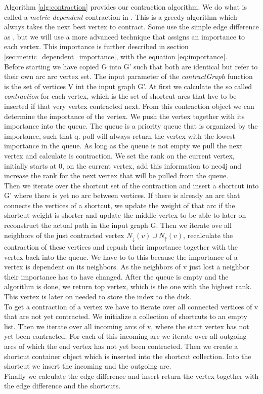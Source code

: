Algorithm \ref{alg:contraction} provides our contraction algorithm. We do what is called a \textit{metric dependent} contraction in \cite[Customization Contraction Hierarchies]{CCH}. 
This is a greedy algorithm which always takes the next best vertex to contract. Some use the simple edge difference as \cite[Contraction Hierarchies]{Geisberger_2012}, but we will use
a more advanced technique that assigns an importance to each vertex. This importance is further described in section \ref{sec:metric_dependent_importance}, with the equation \ref{eq:importance}.
\\
Before starting we have copied G into G' such that both are identical but refer to their own arc arc vertex set. The input parameter of the \textit{contractGraph} function is the set of vertices V int the input graph G'.
At first we calculate the so called \textit{contraction} for each vertex, which is the set of shortcut arcs that hve to be inserted if that very vertex contracted next. From this contraction object we 
can determine the importance of the vertex. We push the vertex together with its importance into the queue. The  queue is a priority queue that is organized by the importance, such that q. poll will always return the vertex with the 
lowest importance in the queue. As long as the queue is not empty we pull the next vertex and calculate is contraction. We set the rank on the current vertex, initially starts at 0, on the current vertex, add this information to neo4j and increase 
the rank for the next vertex that will be pulled from the queue. 
\\ 
Then we iterate over the shortcut set of the contraction and insert a shortcut into G' where there is yet no arc between vertices. If there is already an arc that connects the vertices of a shortcut, we update the weight of that arc if the shortcut
weight is shorter and update the middle vertex to be able to later on reconstruct the actual path in the input graph G.
Then we iterate ove all neighbors of the just contracted vertex $N_\downarrow(v) \cup N_\uparrow(v)$, recalculate the contraction of these vertices and repush their importance together with the vertex back into the queue. We have to to 
this because the importance of a vertex is dependent on its neighbors. As the neighbors of v just lost a neighbor their importance has to have changed.
After the queue is empty and the algorithm is done, we return top vertex, which is the one with the highest rank. This vertex is later on needed to store the index to the disk.
\\
To get a contraction of a vertex we have to iterate over all connected vertices of v that are not yet contracted. We initialize  a collection of shortcuts to an empty list. Then we iterate over all incoming arcs of v, where the start vertex has not 
yet been contracted. For each of this incoming arc we iterate over all outgoing arcs of which the end vertex has not yet been contracted. Then we create a shortcut container object which is inserted into the shortcut collection. Into the shortcut
we insert the incoming and the outgoing arc.
\\
Finally we calculate the edge difference and insert return the vertex together with the edge difference and the shortcuts.




